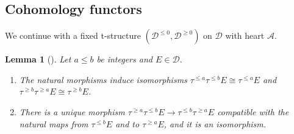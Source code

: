 \documentclass[12pt]{amsart}
\newtheorem{lemma}[theorem]{Lemma}
\numberwithin{theorem}{section}
\theoremstyle{definition}
\newcommand{\calA}{\mathcal{A}}
\newcommand{\calD}{\mathcal{D}}
\newcommand{\Dle}[1]{\calD^{\leqslant #1}}
\newcommand{\Dge}[1]{\calD^{\geqslant #1}}
\begin{document}
	\subsection{Cohomology functors}
	
	We continue with a fixed t-structure $(\Dle{0}, \Dge{0})$ on $\calD$ with heart $\calA$.
	
	\begin{lemma}[{\cite[1.3.4, 1.3.5]{BBD82}}]
		\label{lem:truncations_compose}
		Let $a \leqslant b$ be integers and $E \in \calD$.
		\begin{enumerate}
			\item The natural morphisms induce isomorphisms $\tau^{\leqslant a} \tau^{\leqslant b} E \cong \tau^{\leqslant a} E$ and $\tau^{\geqslant b} \tau^{\geqslant a} E \cong \tau^{\geqslant b} E$.
			\item There is a unique morphism $\tau^{\geqslant a} \tau^{\leqslant b} E \to \tau^{\leqslant b} \tau^{\geqslant a} E$ compatible with the natural maps from $\tau^{\leqslant b} E$ and to $\tau^{\geqslant a} E$, and it is an isomorphism.
		\end{enumerate}
	\end{lemma}
	
\end{document}
